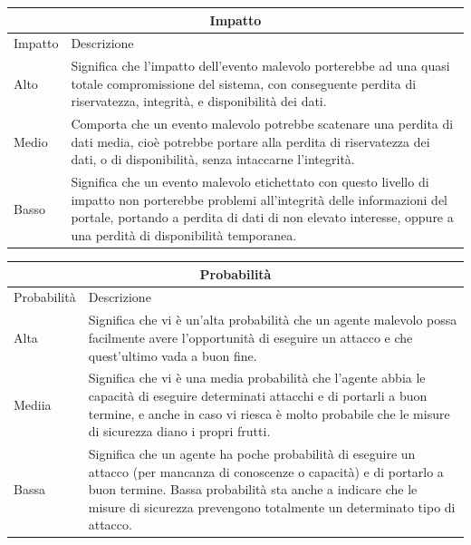\documentclass{article}
\begin{document}
\begin{center}
\begin{tabular}[t]{|p{1.5cm}|p{10cm}|}
\hline
\multicolumn{2}{|c|}{\bf Impatto} \\
\hline
Impatto & Descrizione \\
\hline
\hline
Alto & Significa che l'impatto dell'evento malevolo porterebbe ad una quasi totale compromissione del sistema, con conseguente perdita di riservatezza, integrità, e disponibilità dei dati. \\
\hline
Medio & Comporta che un evento malevolo potrebbe scatenare una perdita di dati media, cioè potrebbe portare alla perdita di riservatezza dei dati, o di disponibilità, senza intaccarne l'integrità.  \\
\hline
Basso   & Significa che un evento malevolo etichettato con questo livello di impatto non porterebbe problemi all'integrità delle informazioni del portale, portando a perdita di dati di non elevato interesse, oppure a una perdità di disponibilità temporanea. \\
\hline
\end{tabular}

%
\vspace{5mm}
%
\noindent %
\begin{tabular}[t]{|p{1.5cm}|p{10cm}|}
\hline
\multicolumn{2}{|c|}{\bf Probabilità} \\
\hline
Probabilità & Descrizione \\
\hline
\hline
Alta   & Significa che vi è un'alta probabilità che un agente malevolo possa facilmente avere l'opportunità di eseguire un attacco e che quest'ultimo vada a buon fine. \\
\hline
Mediia & Significa che vi è una media probabilità che l'agente abbia le capacità di eseguire determinati attacchi e di portarli a buon termine, e anche in caso vi riesca è molto probabile che le misure di sicurezza diano i propri frutti. \\
\hline
Bassa   & Significa che un agente ha poche probabilità di eseguire un attacco (per mancanza di conoscenze o capacità) e di portarlo a buon termine. Bassa probabilità sta anche a indicare che le misure di sicurezza prevengono totalmente un determinato tipo di attacco. \\
\hline
\end{tabular}
\end{center}

\vspace{5mm}
\end{document}
